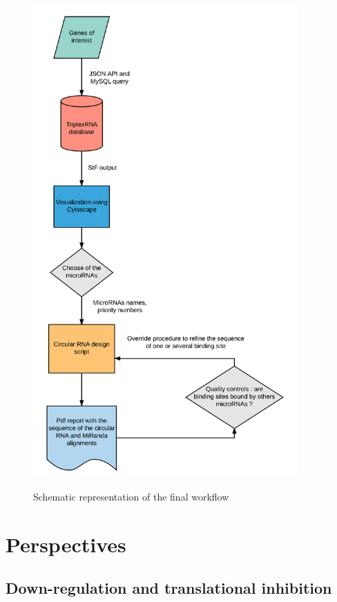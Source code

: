 \documentclass[a4paper,12pt]{report}
\begin{document}
\begin{figure}[H]
	\centering
	{\includegraphics[width=0.9\textwidth]{Final_Workflow.png}}
	\caption{Schematic representation of the final workflow}
\end{figure}

\section{Perspectives}
\subsection{Down-regulation and translational inhibition}
\end{document}
